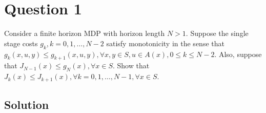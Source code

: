\section*{Question 1}

Consider a finite horizon MDP with horizon length \( N>1 \).
Suppose the single stage costs \( g_{k}, k=0,1, \ldots, N-2 \) satisfy monotonicity in the sense that \( g_{k}(x, u, y) \leq g_{k+1}(x, u, y), \forall x, y \in S, u \in A(x), 0 \leq k \leq N-2 \).
Also, suppose that \( J_{N-1}(x) \leq g_{N}(x), \forall x \in S \).
Show that \( J_{k}(x) \leq J_{k+1}(x), \forall k=0,1, \ldots, N-1, \forall x \in S \).

\subsection*{Solution}
